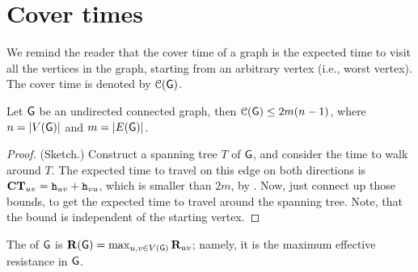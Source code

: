 
%





\ChapterPrefix{}
\ChapterGen{}


\section{Cover times} 

We remind the reader that the cover time of a graph is the expected
time to visit all the vertices in the graph, starting from an
arbitrary vertex (i.e., worst vertex). The cover time is denoted by
$\EuScript{C}(\mathsf{G})$.

\begin{theorem}
    Let $\mathsf{G}$ be an undirected connected graph, then
    $\EuScript{C}(\mathsf{G}) \leq 2m(n-1)$, where $n = |V(\mathsf{G})|$ and $m
    = |E(\mathsf{G})|$.
\end{theorem}

\begin{proof} 
    (Sketch.)  Construct a spanning tree $T$ of $\mathsf{G}$, and consider the
    time to walk around $T$. The expected time to travel on this edge
    on both directions is $\mathbf{CT}_{uv} = \mathtt{h}_{uv} +
    \mathtt{h}_{vu}$, which is smaller than $2m$, by
    .  Now, just connect up those bounds, to
    get the expected time to travel around the spanning tree. Note,
    that the bound is independent of the starting vertex.
\end{proof}

\begin{defn}
    The  of $\mathsf{G}$ is $\mathbf{R}(\mathsf{G}) =
    \max_{u,v \in V(\mathsf{G})} \mathbf{R}_{uv}$; namely, it is the
    maximum effective resistance in $\mathsf{G}$.
\end{defn}

